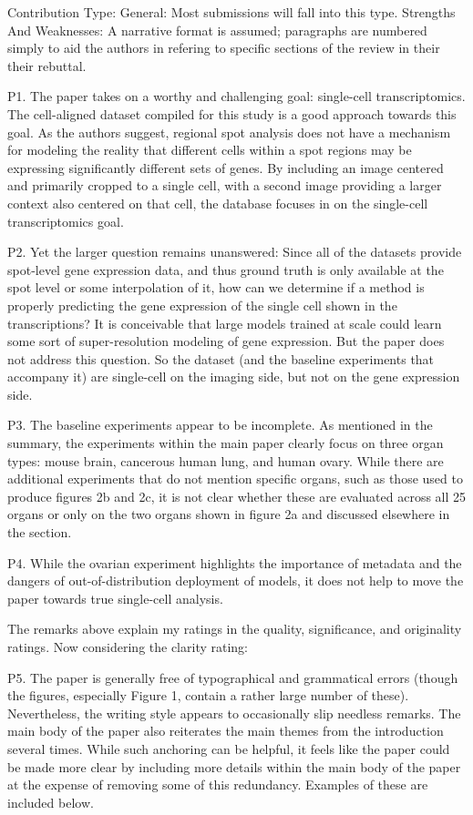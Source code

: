 Contribution Type: General: Most submissions will fall into this type.
Strengths And Weaknesses:
A narrative format is assumed; paragraphs are numbered simply to aid the authors in refering to specific sections of the review in their their rebuttal.

P1. The paper takes on a worthy and challenging goal: single-cell transcriptomics. The cell-aligned dataset compiled for this study is a good approach towards this goal. As the authors suggest, regional spot analysis does not have a mechanism for modeling the reality that different cells within a spot regions may be expressing significantly different sets of genes. By including an image centered and primarily cropped to a single cell, with a second image providing a larger context also centered on that cell, the database focuses in on the single-cell transcriptomics goal.

P2. Yet the larger question remains unanswered: Since all of the datasets provide spot-level gene expression data, and thus ground truth is only available at the spot level or some interpolation of it, how can we determine if a method is properly predicting the gene expression of the single cell shown in the transcriptions? It is conceivable that large models trained at scale could learn some sort of super-resolution modeling of gene expression. But the paper does not address this question. So the dataset (and the baseline experiments that accompany it) are single-cell on the imaging side, but not on the gene expression side.

P3. The baseline experiments appear to be incomplete. As mentioned in the summary, the experiments within the main paper clearly focus on three organ types: mouse brain, cancerous human lung, and human ovary. While there are additional experiments that do not mention specific organs, such as those used to produce figures 2b and 2c, it is not clear whether these are evaluated across all 25 organs or only on the two organs shown in figure 2a and discussed elsewhere in the section.

P4. While the ovarian experiment highlights the importance of metadata and the dangers of out-of-distribution deployment of models, it does not help to move the paper towards true single-cell analysis.

The remarks above explain my ratings in the quality, significance, and originality ratings. Now considering the clarity rating:

P5. The paper is generally free of typographical and grammatical errors (though the figures, especially Figure 1, contain a rather large number of these). Nevertheless, the writing style appears to occasionally slip needless remarks. The main body of the paper also reiterates the main themes from the introduction several times. While such anchoring can be helpful, it feels like the paper could be made more clear by including more details within the main body of the paper at the expense of removing some of this redundancy. Examples of these are included below.

